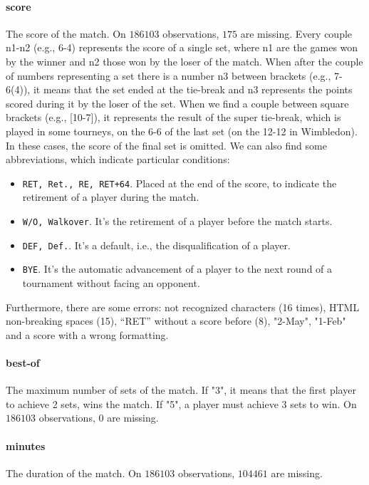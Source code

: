\documentclass{article}
\begin{document}
\paragraph{score}
The score of the match. On $186103$ observations, $175$ are missing. 
Every couple n1-n2 (e.g., 6-4) represents the score of a single set, where n1 are the games won by the winner and n2 those won by the loser of the match.
When after the couple of numbers representing a set there is a number n3 between brackets (e.g., 7-6(4)), it means that the set ended at the tie-break and n3 represents the points scored during it by the loser of the set.
When we find a couple between square brackets (e.g., [10-7]), it represents the result of the super tie-break, which is played in some tourneys, on the 6-6 of the last set (on the 12-12 in Wimbledon). In these cases, the score of the final set is omitted.
We can also find some abbreviations, which indicate particular conditions:
\begin{itemize}
    \item \verb|RET, Ret., RE, RET+64|. Placed at the end of the score, to indicate the retirement of a player during the match.
    \item \verb|W/O, Walkover|. It's the retirement of a player before the match starts. 
    \item \verb|DEF, Def.|. It's a default, i.e., the disqualification of a player.
    \item \verb|BYE|. It's the automatic advancement of a player to the next round of a tournament without facing an opponent. 
\end{itemize}
Furthermore, there are some errors: not recognized characters (16 times), HTML non-breaking spaces (15), “RET” without a score before (8), "2-May", "1-Feb" and a score with a wrong formatting.

\paragraph{best-of}
The maximum number of sets of the match. If "3", it means that the first player to achieve 2 sets, wins the match. If "5", a player must achieve 3 sets to win.  On $186103$ observations, $0$ are missing.

\paragraph{minutes}
The duration of the match. On $186103$ observations, $104461$ are missing.
\end{document}
